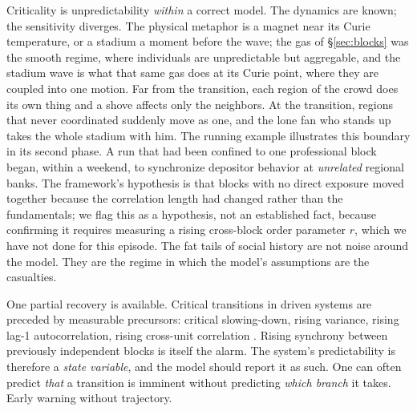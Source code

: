 \documentclass[11pt]{article}
\begin{document}
Criticality is unpredictability \emph{within} a correct model. The dynamics are known; the sensitivity diverges. The physical metaphor is a magnet near its Curie temperature, or a stadium a moment before the wave; the gas of \S\ref{sec:blocks} was the smooth regime, where individuals are unpredictable but aggregable, and the stadium wave is what that same gas does at its Curie point, where they are coupled into one motion. Far from the transition, each region of the crowd does its own thing and a shove affects only the neighbors. At the transition, regions that never coordinated suddenly move as one, and the lone fan who stands up takes the whole stadium with him. The running example illustrates this boundary in its second phase. A run that had been confined to one professional block began, within a weekend, to synchronize depositor behavior at \emph{unrelated} regional banks. The framework's hypothesis is that blocks with no direct exposure moved together because the correlation length had changed rather than the fundamentals; we flag this as a hypothesis, not an established fact, because confirming it requires measuring a rising cross-block order parameter $r$, which we have not done for this episode. The fat tails of social history are not noise around the model. They are the regime in which the model's assumptions are the casualties.

One partial recovery is available. Critical transitions in driven systems are preceded by measurable precursors: critical slowing-down, rising variance, rising lag-1 autocorrelation, rising cross-unit correlation \cite{scheffer2009}. Rising synchrony between previously independent blocks is itself the alarm. The system's predictability is therefore a \emph{state variable}, and the model should report it as such. One can often predict \emph{that} a transition is imminent without predicting \emph{which branch} it takes. Early warning without trajectory.
\end{document}
